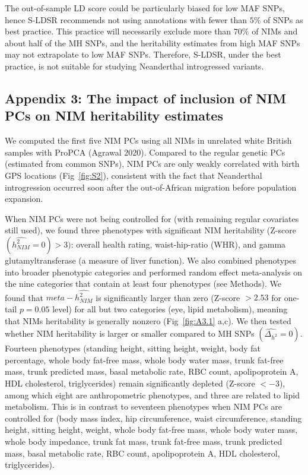 The out-of-sample LD score could be particularly biased for low MAF SNPs, hence S-LDSR recommends not using annotations with fewer than $5\%$ of SNPs as best practice. This practice will necessarily exclude more than $70\%$ of NIMs and about half of the MH SNPs, and the heritability estimates from high MAF SNPs may not extrapolate to low MAF SNPs. Therefore, S-LDSR, under the best practice, is not suitable for studying Neanderthal introgressed variants. 

\subsection{Appendix 3: The impact of inclusion of NIM PCs on NIM heritability estimates}
\label{asec:3}
We computed the first five NIM PCs using all NIMs in unrelated white British samples with ProPCA (Agrawal 2020). Compared to the regular genetic PCs (estimated from common SNPs), NIM PCs are only weakly correlated with birth GPS locations (Fig~\ref{fig:S2}), consistent with the fact that Neanderthal introgression occurred soon after the out-of-African migration before population expansion. 

When NIM PCs were not being controlled for (with remaining regular covariates still used), we found three phenotypes with significant NIM heritability (Z-score $(\hat{h_{NIM}^2}=0) > 3)$: overall health rating, waist-hip-ratio (WHR), and gamma glutamyltransferase (a measure of liver function). We also combined phenotypes into broader phenotypic categories and performed random effect meta-analysis on the nine categories that contain at least four phenotypes (see Methods). We found that $meta-\hat{h_{NIM}^2}$ is significantly larger than zero  (Z-score $> 2.53$ for one-tail $p = 0.05$ level) for all but two categories (eye, lipid metabolism), meaning that NIMs heritability is generally nonzero (Fig~\ref{fig:A3.1} a,c). We then tested whether NIM heritability is larger or smaller compared to MH SNPs  $(\hat{\Delta_{h^2}} = 0)$. Fourteen phenotypes (standing height, sitting height, weight, body fat percentage, whole body fat-free mass, whole body water mass, trunk fat-free mass, trunk predicted mass, basal metabolic rate, RBC count, apolipoprotein A, HDL cholesterol, triglycerides) remain significantly depleted (Z-score $< -3$), among which eight are anthropometric phenotypes, and three are related to lipid metabolism. This is in contrast to seventeen phenotypes when NIM PCs are controlled for (body mass index, hip circumference, waist circumference, standing height, sitting height, weight, whole body fat-free mass, whole body water mass, whole body impedance, trunk fat mass, trunk fat-free mass, trunk predicted mass, basal metabolic rate, RBC count, apolipoprotein A, HDL cholesterol, triglycerides). 

